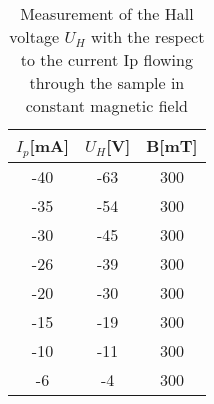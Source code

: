 \documentclass[a4paper,12pt]{article}
\begin{document}
\begin{table}[H]
\begin{center}
\caption{Measurement of the Hall voltage $U_H$ with the respect to the current Ip flowing through the sample in constant magnetic field}
\begin{tabular}{|c|c|c|}
\hline
$I_p$[mA] & $U_H$[V] & B[mT] \\   
\hline
\hline
-40 &	-63  & 300 \\
\hline
-35 &	-54  & 300 \\
\hline
-30 &	-45  & 300 \\
\hline
-26 &	-39  & 300 \\
\hline
-20 &	-30  & 300 \\
\hline
-15 &	-19  & 300 \\
\hline
-10 &	-11  & 300 \\
\hline
-6 &	-4  & 300 \\
\hline
\end{tabular} 
\end{center}
\end{table}
\end{document}
